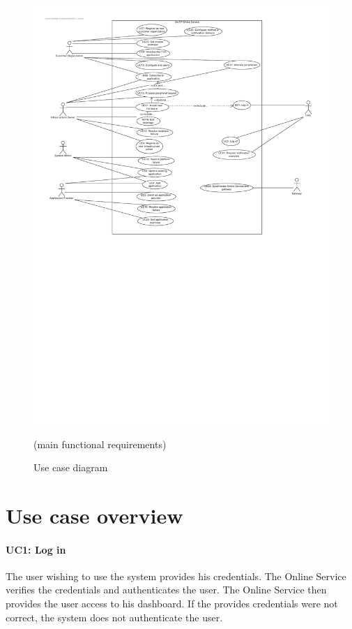 \begin{figure}[H]
    \centering
    \includegraphics[width=\textwidth]{Use_Case_Diagram.pdf}
    \caption{Use case diagram} (main functional requirements) \label{fig:Use_Case_Diagram}
\end{figure}

\section{Use case overview}\label{sec:uc_overview}
\paragraph{UC1: Log in}
The user wishing to use the system provides his credentials.
The Online Service verifies the credentials and authenticates the user.
The Online Service then provides the user access to his dashboard.
If the provides credentials were not correct, the system does not authenticate the user.

